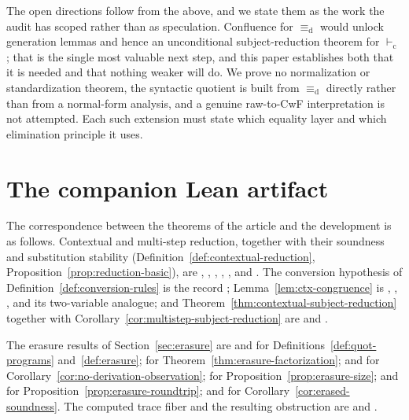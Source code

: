 \documentclass[10pt,reqno]{amsart}
\newcommand{\defeq}{\mathrel{\equiv_{\mathrm d}}}
\newcommand{\vdashC}{\vdash_{\mathrm{c}}}
\begin{document}
The open directions follow from the above, and we state them as the work the
audit has scoped rather than as speculation.  Confluence for \(\defeq\) would
unlock generation lemmas and hence an unconditional subject-reduction theorem
for \(\vdashC\); that is the single most valuable next step, and this paper
establishes both that it is needed and that nothing weaker will do.  We prove no
normalization or standardization theorem, the syntactic quotient is built from
\(\defeq\) directly rather than from a normal-form analysis, and a genuine
raw-to-CwF interpretation is not attempted.  Each such extension must state
which equality layer and which elimination principle it uses.

\appendix

\section{The companion Lean artifact}
\label{app:artifact}

The correspondence between the theorems of the article and the development is as
follows.  Contextual and multi-step reduction, together with their soundness
and substitution stability
(Definition~\ref{def:contextual-reduction},
Proposition~\ref{prop:reduction-basic}), are
, , ,
, , and
.  The conversion hypothesis of
Definition~\ref{def:conversion-rules} is the record ;
Lemma~\ref{lem:ctx-congruence} is ,
, ,
 and its two-variable analogue; and
Theorem~\ref{thm:contextual-subject-reduction} together with
Corollary~\ref{cor:multistep-subject-reduction} are
 and .

The erasure results of Section~\ref{sec:erasure} are
 and  for
Definitions~\ref{def:quot-programs} and~\ref{def:erasure};
 for
Theorem~\ref{thm:erasure-factorization};
 and
 for
Corollary~\ref{cor:no-derivation-observation};
 for Proposition~\ref{prop:erasure-size};
 and  for
Proposition~\ref{prop:erasure-roundtrip}; and
 for
Corollary~\ref{cor:erased-soundness}.  The computed trace fiber and the
resulting obstruction are  and
.
\end{document}
